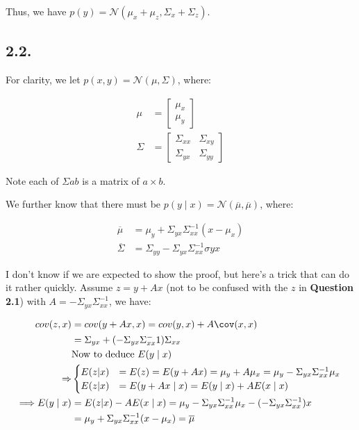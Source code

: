 \documentclass[11pt]{article}
\providecommand{\qbm}[1]{\begin{bmatrix} #1 \end{bmatrix}}
\begin{document}
Thus, we have $p(y) = \mathcal N(\mu_x+\mu_z,\Sigma_x+\Sigma_z)$.


\subsection*{2.2.}


For clarity, we let $p(x, y) = \mathcal N(\mu, \Sigma)$, where:

\begin{align*}
    \mu &= \qbm{\mu_x \\ \mu_y} \\
    \Sigma &= \qbm{\Sigma_{xx} & \Sigma_{xy} \\ \Sigma_{yx} & \Sigma_{yy}}
\end{align*}

Note each of $\Sigma{ab}$ is a matrix of $a \times b$.

We further know that there must be $p(y \mid x) = \mathcal N(\overline{\mu}, \overline{\mu})$, where:

\begin{align*}
    \overline{\mu} &= \mu_y + \Sigma_{yx} \Sigma_{xx}^{-1} (x - \mu_x) \\
    \overline{\Sigma} &= \Sigma_{yy} - \Sigma_{yx} \Sigma_{xx}^{-1}\sigma{yx}
\end{align*}

I don't know if we are expected to show the proof, but here's a trick that can do it rather quickly. Assume $z = y + Ax$ (not to be confused with the $z$ in \textbf{Question 2.1}) with $A = -\Sigma_{yx} \Sigma_{xx}^{-1}$, we have:

\begin{align*}
    cov(z, x) &= cov(y + Ax, x) = cov(y, x) + A \cov(x, x) \\
    &= \Sigma_{yx} + (-\Sigma_{yx} \Sigma_{xx}^-1) \Sigma_{xx} \\
    &\text{Now to deduce $E(y \mid x)$} \\
    \Rightarrow &\begin{cases}
        E(z | x) &= E(z) = E(y + Ax) = \mu_y + A \mu_x = \mu_y -\Sigma_{yx} \Sigma_{xx}^{-1} \mu_x \\
        E(z | x) &= E(y + Ax \mid x) = E(y \mid x) + A E(x \mid x)
    \end{cases} \\
    \Longrightarrow E(y \mid x) &= E(z | x) - A E(x \mid x) = \mu_y -\Sigma_{yx} \Sigma_{xx}^{-1} \mu_x - (-\Sigma_{yx} \Sigma_{xx}^{-1}) x \\
    &= \mu_y + \Sigma_{yx} \Sigma_{xx}^{-1} (x - \mu_x) = \overline{\mu}
\end{align*}
\end{document}
